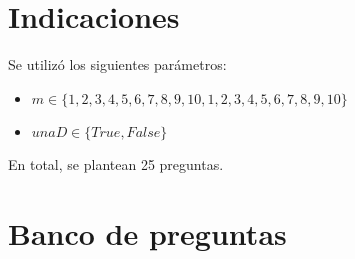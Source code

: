 \documentclass[a4,11pt]{aleph-notas}
\begin{document}
\encabezado

\section{Indicaciones}



Se utilizó los siguientes parámetros:
\begin{itemize}
	\item $m \in \{1, 2, 3, 4, 5, 6, 7, 8, 9, 10, 1, 2, 3, 4, 5, 6, 7, 8, 9, 10\}$
	\item $unaD \in \{True, False\}$

\end{itemize}
En total, se plantean 25 preguntas.


\section{Banco de preguntas}
\end{document}
